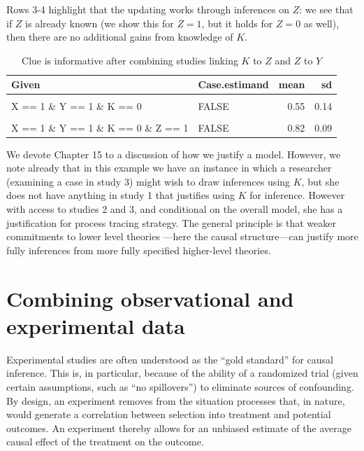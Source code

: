 \documentclass[
  12pt,
]{book}
\begin{document}
Rows 3-4 highlight that the updating works through inferences on \(Z\): we see that if \(Z\) is already known (we show this for \(Z=1\), but it holds for \(Z=0\) as well), then there are no additional gains from knowledge of \(K\).

\begin{table}

\caption{\label{tab:frank4}Clue is informative after combining studies linking $K$ to $Z$ and $Z$ to $Y$}
\centering
\begin{tabular}[t]{llrr}
\toprule
Given & Case.estimand & mean & sd\\
\midrule
\cellcolor{gray!6}{X == 1 \& Y == 1 \& K == 1} & \cellcolor{gray!6}{FALSE} & \cellcolor{gray!6}{0.80} & \cellcolor{gray!6}{0.09}\\
X == 1 \& Y == 1 \& K == 0 & FALSE & 0.55 & 0.14\\
\cellcolor{gray!6}{X == 1 \& Y == 1 \& K == 1 \& Z == 1} & \cellcolor{gray!6}{FALSE} & \cellcolor{gray!6}{0.82} & \cellcolor{gray!6}{0.09}\\
X == 1 \& Y == 1 \& K == 0 \& Z == 1 & FALSE & 0.82 & 0.09\\
\bottomrule
\end{tabular}
\end{table}

We devote Chapter 15 to a discussion of how we justify a model. However, we note already that in this example we have an instance in which a researcher (examining a case in study 3) might wish to draw inferences using \(K\), but she does not have anything in study 1 that justifies using \(K\) for inference. However with access to studies 2 and 3, and conditional on the overall model, she has a justification for process tracing strategy. The general principle is that weaker commitments to lower level theories ---here the causal structure---can justify more fully inferences from more fully specified higher-level theories.

\hypertarget{combining-observational-and-experimental-data}{%
\section{Combining observational and experimental data}\label{combining-observational-and-experimental-data}}

Experimental studies are often understood as the ``gold standard'' for causal inference. This is, in particular, because of the ability of a randomized trial (given certain assumptions, such as ``no spillovers'') to eliminate sources of confounding. By design, an experiment removes from the situation processes that, in nature, would generate a correlation between selection into treatment and potential outcomes. An experiment thereby allows for an unbiased estimate of the average causal effect of the treatment on the outcome.
\end{document}
